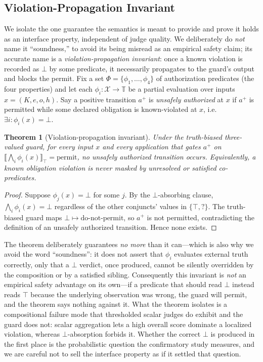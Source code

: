 \documentclass[sigconf,anonymous,review]{acmart}
\newtheorem{theorem}{Theorem}
\begin{document}
\subsection{Violation-Propagation Invariant}
We isolate the one guarantee the semantics is meant to provide and prove it holds as an interface property, independent of judge quality. We deliberately do \emph{not} name it ``soundness,'' to avoid its being misread as an empirical safety claim; its accurate name is a \emph{violation-propagation invariant}: once a known violation is recorded as $\bot$ by some predicate, it necessarily propagates to the guard's output and blocks the permit. Fix a set $\Phi=\{\phi_1,\dots,\phi_4\}$ of authorization predicates (the four properties) and let each $\phi_i:\mathcal{X}\to\mathbb{T}$ be a partial evaluation over inputs $x=(K,e,o,h)$. Say a positive transition $a^+$ is \emph{unsafely authorized} at $x$ if $a^+$ is permitted while some declared obligation is known-violated at $x$, i.e.\ $\exists i:\phi_i(x)=\bot$.

\begin{theorem}[Violation-propagation invariant]
\label{thm:soundness}
Under the truth-biased three-valued guard, for every input $x$ and every application that gates $a^+$ on $\llbracket\bigwedge_i\phi_i(x)\rrbracket_\top=\text{permit}$, no unsafely authorized transition occurs. Equivalently, a known obligation violation is never masked by unresolved or satisfied co-predicates.
\end{theorem}
\begin{proof}
Suppose $\phi_j(x)=\bot$ for some $j$. By the $\bot$-absorbing clause, $\bigwedge_i\phi_i(x)=\bot$ regardless of the other conjuncts' values in $\{\top,?\}$. The truth-biased guard maps $\bot\mapsto\text{do-not-permit}$, so $a^+$ is not permitted, contradicting the definition of an unsafely authorized transition. Hence none exists.
\end{proof}

The theorem deliberately guarantees \emph{no more} than it can---which is also why we avoid the word ``soundness'': it does not assert that $\phi_i$ evaluates external truth correctly, only that a $\bot$ verdict, once produced, cannot be silently overridden by the composition or by a satisfied sibling. Consequently this invariant is \emph{not} an empirical safety advantage on its own---if a predicate that should read $\bot$ instead reads $\top$ because the underlying observation was wrong, the guard will permit, and the theorem says nothing against it. What the theorem isolates is a compositional failure mode that thresholded scalar judges do exhibit and the guard does not: scalar aggregation lets a high overall score dominate a localized violation, whereas $\bot$-absorption forbids it. Whether the correct $\bot$ is produced in the first place is the probabilistic question the confirmatory study measures, and we are careful not to sell the interface property as if it settled that question.
\end{document}
